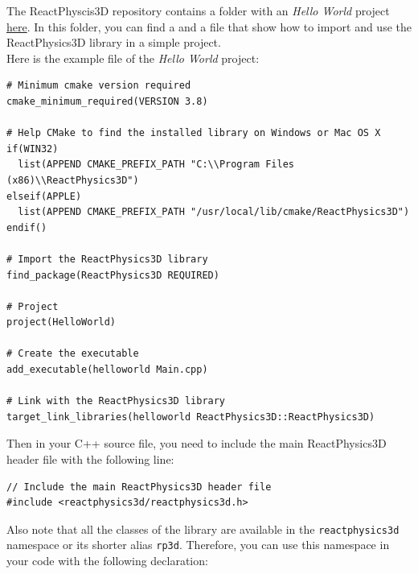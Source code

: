 \documentclass[a4paper,12pt]{article}
\begin{document}
    \vspace{0.6cm}

   The ReactPhyscis3D repository contains a folder with an \emph{Hello World} project \href{https://github.com/DanielChappuis/reactphysics3d/tree/master/helloworld}{here}. In this folder, you can find a  and a  file that show how to import and use the ReactPhysics3D library in a simple project. \\

   Here is the example  file of the \emph{Hello World} project:
   
    \vspace{0.6cm}

    \begin{lstlisting}
# Minimum cmake version required
cmake_minimum_required(VERSION 3.8)

# Help CMake to find the installed library on Windows or Mac OS X
if(WIN32)
  list(APPEND CMAKE_PREFIX_PATH "C:\\Program Files (x86)\\ReactPhysics3D")
elseif(APPLE)
  list(APPEND CMAKE_PREFIX_PATH "/usr/local/lib/cmake/ReactPhysics3D")
endif()

# Import the ReactPhysics3D library 
find_package(ReactPhysics3D REQUIRED)

# Project
project(HelloWorld)

# Create the executable
add_executable(helloworld Main.cpp)

# Link with the ReactPhysics3D library
target_link_libraries(helloworld ReactPhysics3D::ReactPhysics3D)
    \end{lstlisting}

    \lstset{style=customcpp}

    \vspace{0.6cm}
   
    Then in your C++ source file, you need to include the main ReactPhysics3D header file with the following line: \\

    \begin{lstlisting}
// Include the main ReactPhysics3D header file
#include <reactphysics3d/reactphysics3d.h>
  \end{lstlisting}

    \vspace{0.6cm}

    Also note that all the classes of the library are available in the \texttt{reactphysics3d} namespace or its shorter alias
    \texttt{rp3d}. Therefore, you can use this namespace in your code with the following declaration: \\
\end{document}
